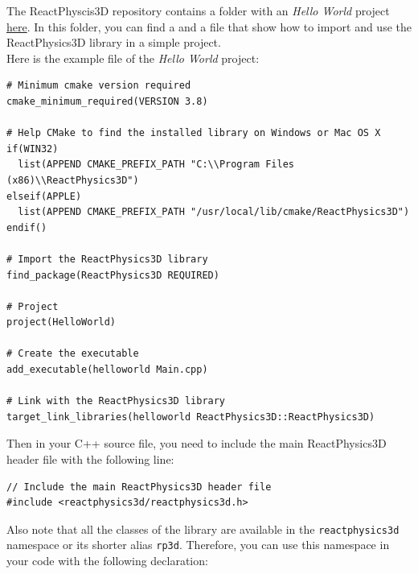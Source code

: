 \documentclass[a4paper,12pt]{article}
\begin{document}
    \vspace{0.6cm}

   The ReactPhyscis3D repository contains a folder with an \emph{Hello World} project \href{https://github.com/DanielChappuis/reactphysics3d/tree/master/helloworld}{here}. In this folder, you can find a  and a  file that show how to import and use the ReactPhysics3D library in a simple project. \\

   Here is the example  file of the \emph{Hello World} project:
   
    \vspace{0.6cm}

    \begin{lstlisting}
# Minimum cmake version required
cmake_minimum_required(VERSION 3.8)

# Help CMake to find the installed library on Windows or Mac OS X
if(WIN32)
  list(APPEND CMAKE_PREFIX_PATH "C:\\Program Files (x86)\\ReactPhysics3D")
elseif(APPLE)
  list(APPEND CMAKE_PREFIX_PATH "/usr/local/lib/cmake/ReactPhysics3D")
endif()

# Import the ReactPhysics3D library 
find_package(ReactPhysics3D REQUIRED)

# Project
project(HelloWorld)

# Create the executable
add_executable(helloworld Main.cpp)

# Link with the ReactPhysics3D library
target_link_libraries(helloworld ReactPhysics3D::ReactPhysics3D)
    \end{lstlisting}

    \lstset{style=customcpp}

    \vspace{0.6cm}
   
    Then in your C++ source file, you need to include the main ReactPhysics3D header file with the following line: \\

    \begin{lstlisting}
// Include the main ReactPhysics3D header file
#include <reactphysics3d/reactphysics3d.h>
  \end{lstlisting}

    \vspace{0.6cm}

    Also note that all the classes of the library are available in the \texttt{reactphysics3d} namespace or its shorter alias
    \texttt{rp3d}. Therefore, you can use this namespace in your code with the following declaration: \\
\end{document}
